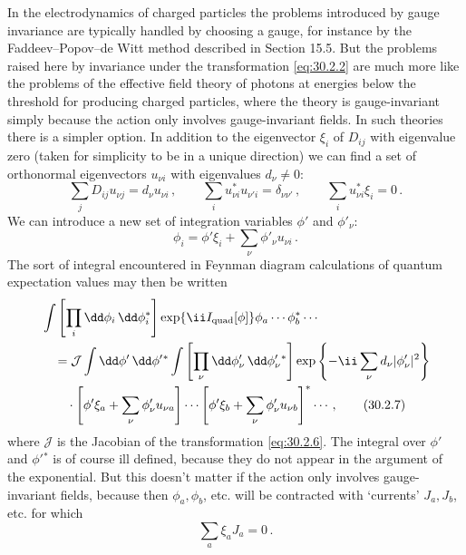 In the electrodynamics of charged particles the problems introduced by gauge
invariance are typically handled by choosing a gauge, for instance by the
Faddeev--Popov--de Witt method described in Section 15.5. But the problems
raised here by invariance under the transformation \eqref{eq:30.2.2} are much
more like the problems of the effective field theory of photons at energies
below the threshold for producing charged particles, where the theory is
gauge-invariant simply because the action only involves gauge-invariant
fields. In such theories there is a simpler option. In addition to the
eigenvector \(\xi_i\) of \(D_{ij}\) with eigenvalue zero (taken for simplicity
to be in a unique direction) we can find a set of orthonormal eigenvectors
\(u_{\nu i}\) with eigenvalues \(d_\nu\neq0\):
\begin{equation}
  \sum_jD_{ij}u_{\nu j}=d_\nu u_{\nu i}\,,
  \qquad
  \sum_i u_{\nu i}^*u_{\nu'i}=\delta_{\nu\nu'}\,,
  \qquad
  \sum_i u_{\nu i}^*\xi_i=0\,.
  \tag{30.2.5}\label{eq:30.2.5}
\end{equation}
We can introduce a new set of integration variables \(\phi'\) and
\(\phi'_\nu\):
\begin{equation}
  \phi_i=\phi'\xi_i+\sum_\nu\phi'_\nu u_{\nu i}\,.
  \tag{30.2.6}\label{eq:30.2.6}
\end{equation}
The sort of integral encountered in Feynman diagram calculations of quantum
expectation values may then be written
\begin{align}
  &\int\left[\prod_i \dd\phi_i\,\dd\phi_i^*\right]
    \exp\{\ii I_{\mathrm{quad}}[\phi]\}
    \phi_a\cdots\phi_b^*\cdots
  \notag\\
  &\quad={}
    \mathcal{J}\int \dd\phi'\,\dd\phi'{}^*
    \int\left[\prod_\nu \dd\phi'_\nu\,\dd\phi_\nu'{}^*\right]
    \exp\left\{-\ii\sum_\nu d_\nu|\phi'_\nu|^2\right\}
  \notag\\
  &\qquad\cdot
    \left[\phi'\xi_a+\sum_\nu\phi'_\nu u_{\nu a}\right]\cdots
    \left[\phi'\xi_b+\sum_\nu\phi'_\nu u_{\nu b}\right]^*\cdots\,,
  \tag{30.2.7}\label{eq:30.2.7}
\end{align}
where \(\mathcal{J}\) is the Jacobian of the transformation
\eqref{eq:30.2.6}. The integral over \(\phi'\) and \(\phi'{}^*\) is of course
ill defined, because they do not appear in the argument of the exponential.
But this doesn't matter if the action only involves gauge-invariant fields,
because then \(\phi_a,\phi_b\), etc. will be contracted with `currents'
\(J_a,J_b\), etc. for which
\begin{equation}
  \sum_a\xi_aJ_a=0\,.
  \tag{30.2.8}\label{eq:30.2.8}
\end{equation}
